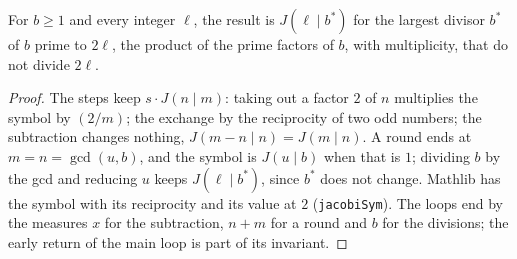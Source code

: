 \begin{lemma}\label{lem:jacobi}
  \leanok
  For $b \ge 1$ and every integer $\ell$, the result is $J(\ell \mid b^*)$ for the largest divisor
  $b^*$ of $b$ prime to $2 \ell$, the product of the prime factors of $b$, with multiplicity, that
  do not divide $2 \ell$.
\end{lemma}

\begin{proof}
  \leanok
  The steps keep $s \cdot J(n \mid m)$: taking out a factor $2$ of $n$ multiplies the symbol by
  $(2 / m)$; the exchange by the reciprocity of two odd numbers; the subtraction changes nothing,
  $J(m - n \mid n) = J(m \mid n)$. A round ends at $m = n = \gcd(u, b)$, and the symbol is
  $J(u \mid b)$ when that is $1$; dividing $b$ by the gcd and reducing $u$ keeps $J(\ell \mid b^*)$,
  since $b^*$ does not change. Mathlib has the symbol with its reciprocity and its value at $2$
  (\verb|jacobiSym|). The loops end by the measures $x$ for the subtraction, $n + m$ for a round
  and $b$ for the divisions; the early return of the main loop is part of its invariant.
\end{proof}

